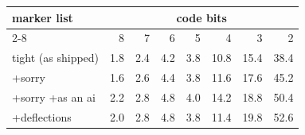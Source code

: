\begin{tabular}{lrrrrrrr}
\toprule
marker list & \multicolumn{7}{c}{code bits} \\
\cmidrule(lr){2-8}
 & 8 & 7 & 6 & 5 & 4 & 3 & 2 \\
\midrule
tight (as shipped) & 1.8 & 2.4 & 4.2 & 3.8 & 10.8 & 15.4 & 38.4 \\
+sorry & 1.6 & 2.6 & 4.4 & 3.8 & 11.6 & 17.6 & 45.2 \\
+sorry +as an ai & 2.2 & 2.8 & 4.8 & 4.0 & 14.2 & 18.8 & 50.4 \\
+deflections & 2.0 & 2.8 & 4.8 & 3.8 & 11.4 & 19.8 & 52.6 \\
\bottomrule
\end{tabular}
